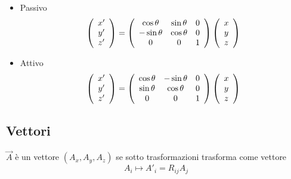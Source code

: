 \documentclass[a4paper,11pt]{report}
\theoremstyle{remark}
\theoremstyle{definition}
\begin{document}
\begin{itemize}
    \item Passivo
    \begin{equation*}
        \left(\begin{array}[]{c}
            x' \\
            y' \\
            z'
        \end{array}\right) =
        \left(\begin{array}[]{ccc}
            \cos\theta & \sin\theta & 0 \\
            -\sin\theta & \cos\theta & 0 \\
            0 & 0 & 1
        \end{array}\right)
        \left(\begin{array}[]{c}
            x \\
            y \\
            z 
        \end{array}\right)
    \end{equation*}
    \item Attivo
    \begin{equation*}
        \left(\begin{array}[]{c}
            x' \\
            y' \\
            z'
        \end{array}\right) =
        \left(\begin{array}[]{ccc}
            \cos\theta & -\sin\theta & 0 \\
            \sin\theta & \cos\theta & 0 \\
            0 & 0 & 1
        \end{array}\right)
        \left(\begin{array}[]{c}
            x \\
            y \\
            z 
        \end{array}\right)
    \end{equation*}
\end{itemize}

\subsection*{Vettori}

$\vec{A}$ è un vettore $(A_x,A_y,A_z)$ se sotto trasformazioni trasforma come vettore
\begin{equation*}
    A_i \mapsto A'_i = R_{ij}A_j
\end{equation*}
\end{document}
